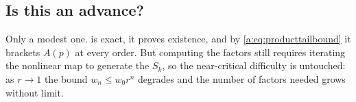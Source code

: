 \subsection{Is this an advance?}
\label{a:sec:isadvance}

Only a modest one.  is exact, it proves existence, and by
\cref{a:eq:producttailbound} it brackets $A(p)$ at every order. But computing the
factors still requires iterating the
nonlinear map to generate the $S_k$, so the near-critical difficulty is untouched:
as $r\to1$ the bound $w_n\le w_0r^n$ degrades and the number of factors needed
grows without limit.
